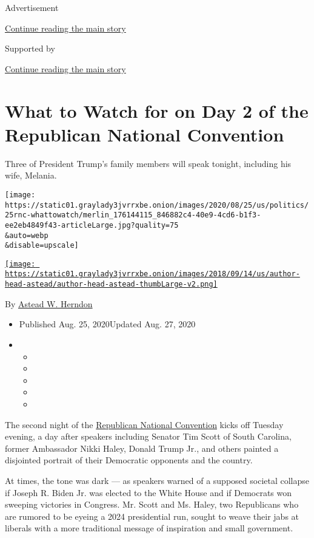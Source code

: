 Advertisement

\protect\hyperlink{after-top}{Continue reading the main story}

Supported by

\protect\hyperlink{after-sponsor}{Continue reading the main story}

\hypertarget{what-to-watch-for-on-day-2-of-the-republican-national-convention}{%
\section{What to Watch for on Day 2 of the Republican National
Convention}\label{what-to-watch-for-on-day-2-of-the-republican-national-convention}}

Three of President Trump's family members will speak tonight, including
his wife, Melania.

\texttt{[image: https://static01.graylady3jvrrxbe.onion/images/2020/08/25/us/politics/25rnc-whattowatch/merlin\_176144115\_846882c4-40e9-4cd6-b1f3-ee2eb4849f43-articleLarge.jpg?quality=75\\\&auto=webp\\\&disable=upscale]}

\href{https://www.nytimes3xbfgragh.onion/by/astead-w-herndon}{\texttt{[image: https://static01.graylady3jvrrxbe.onion/images/2018/09/14/us/author-head-astead/author-head-astead-thumbLarge-v2.png]}}

By \href{https://www.nytimes3xbfgragh.onion/by/astead-w-herndon}{Astead
W. Herndon}

\begin{itemize}
\item
  Published Aug. 25, 2020Updated Aug. 27, 2020
\item
  \begin{itemize}
  \item
  \item
  \item
  \item
  \item
  \end{itemize}
\end{itemize}

The second night of the
\href{https://www.nytimes3xbfgragh.onion/2020/08/27/us/politics/how-to-watch-republican-convention.html}{Republican
National Convention} kicks off Tuesday evening, a day after speakers
including Senator Tim Scott of South Carolina, former Ambassador Nikki
Haley, Donald Trump Jr., and others painted a disjointed portrait of
their Democratic opponents and the country.

At times, the tone was dark --- as speakers warned of a supposed
societal collapse if Joseph R. Biden Jr. was elected to the White House
and if Democrats won sweeping victories in Congress. Mr. Scott and Ms.
Haley, two Republicans who are rumored to be eyeing a 2024 presidential
run, sought to weave their jabs at liberals with a more traditional
message of inspiration and small government.

